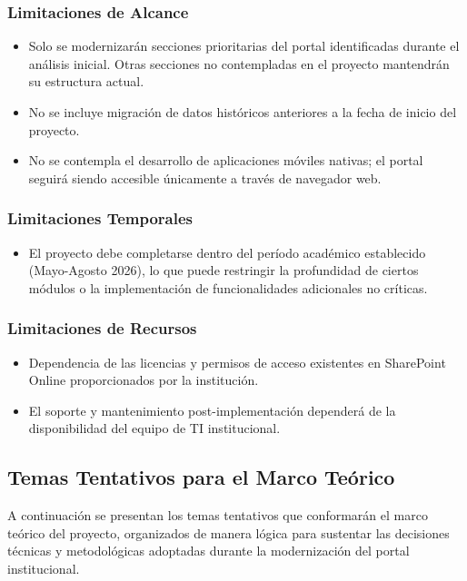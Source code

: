 \subsubsection*{Limitaciones de Alcance}
\begin{itemize}
    \item Solo se modernizarán secciones prioritarias del portal identificadas durante el análisis inicial. Otras secciones no contempladas en el proyecto mantendrán su estructura actual.
    \item No se incluye migración de datos históricos anteriores a la fecha de inicio del proyecto.
    \item No se contempla el desarrollo de aplicaciones móviles nativas; el portal seguirá siendo accesible únicamente a través de navegador web.
\end{itemize}

\subsubsection*{Limitaciones Temporales}
\begin{itemize}
    \item El proyecto debe completarse dentro del período académico establecido (Mayo-Agosto 2026), lo que puede restringir la profundidad de ciertos módulos o la implementación de funcionalidades adicionales no críticas.
\end{itemize}

\subsubsection*{Limitaciones de Recursos}
\begin{itemize}
    \item Dependencia de las licencias y permisos de acceso existentes en SharePoint Online proporcionados por la institución.
    \item El soporte y mantenimiento post-implementación dependerá de la disponibilidad del equipo de TI institucional.
\end{itemize}

\subsection{Temas Tentativos para el Marco Teórico}
\label{sec:temas_tentativos}

A continuación se presentan los temas tentativos que conformarán el marco teórico del proyecto, organizados de manera lógica para sustentar las decisiones técnicas y metodológicas adoptadas durante la modernización del portal institucional.

